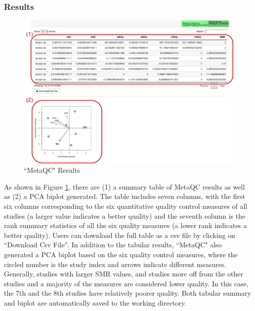 \subsubsection{Results}


\begin{figure}[H]
\begin{center}
\includegraphics[scale=0.4]{./figure/metaQC/metaQCresult.jpg}
\caption{``MetaQC" Results}
\label{fig:MetaQCresult}
\end{center}
\end{figure}

As shown in Figure \ref{fig:MetaQCresult}, there are (1) a summary table of MetaQC results as well as (2) a PCA biplot generated. The table includes seven columns, with the first six columns corresponding to the six quantitative quality control measures of all studies (a larger value indicates a better quality) and the seventh column is the rank summary statistics of all the six quality measures (a lower rank indicates a better quality). Users can download the full table as a csv file by clicking on ``Download Csv File". In addition to the tabular results, ``MetaQC" also generated a PCA biplot based on the six quality control measures, where the circled number is the study index and arrows indicate different measures. Generally, studies with larger SMR values, and studies more off from the other studies and a majority of the measures are considered lower quality. In this case, the 7th and the 8th studies have relatively poorer quality. Both tabular summary and biplot are automatically saved to the working directory. 


